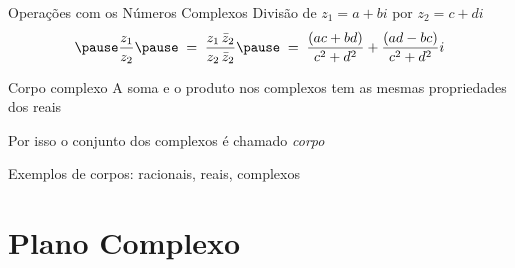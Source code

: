 \begin{frame}{Operações com os Números Complexos}
  Divisão de \(z_1=a+bi\) por \(z_2=c+di\)
  \[
    \pause
    \frac{z_1}{z_2}
    \pause
    \;=\; \frac{z_1\,\bar{z}_2}{z_2\,\bar{z}_2}
    \pause
    \;=\; \frac{(ac + bd)}{c^2 + d^2} + \frac{(ad -bc)}{c^2 + d^2}i
  \]
\end{frame}

\begin{frame}{Corpo complexo}
  A soma e o produto nos complexos tem as mesmas propriedades dos reais

  \vspace{\baselineskip}
  Por isso o conjunto dos complexos é chamado \emph{corpo}

  \vspace{\baselineskip}
  Exemplos de corpos: racionais, reais, complexos
\end{frame}



\section{Plano Complexo}

